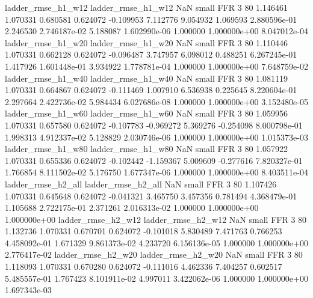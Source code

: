       ladder_rmse_h1_w12       ladder_rmse_h1_w12                   NaN      small      FFR                 3 80 1.146461       1.070331 0.680581       0.624072   -0.109953      7.112776      9.054932     1.069593   2.880596e-01  2.246530 2.746187e-02     5.188087   1.602990e-06            1.000000    1.000000e+00        8.047012e-04
      ladder_rmse_h1_w20       ladder_rmse_h1_w20                   NaN      small      FFR                 3 80 1.110446       1.070331 0.662128       0.624072   -0.096487      3.747957      6.098012     0.488251   6.267245e-01  1.417926 1.601448e-01     3.934922   1.778781e-04            1.000000    1.000000e+00        7.648759e-02
      ladder_rmse_h1_w40       ladder_rmse_h1_w40                   NaN      small      FFR                 3 80 1.081119       1.070331 0.664867       0.624072   -0.111469      1.007910      6.536938     0.225645   8.220604e-01  2.297664 2.422736e-02     5.984434   6.027686e-08            1.000000    1.000000e+00        3.152480e-05
      ladder_rmse_h1_w60       ladder_rmse_h1_w60                   NaN      small      FFR                 3 80 1.059956       1.070331 0.657580       0.624072   -0.107783     -0.969272      5.369276    -0.254098   8.000798e-01  1.998313 4.912337e-02     5.128829   2.030746e-06            1.000000    1.000000e+00        1.015373e-03
      ladder_rmse_h1_w80       ladder_rmse_h1_w80                   NaN      small      FFR                 3 80 1.057922       1.070331 0.655336       0.624072   -0.102442     -1.159367      5.009609    -0.277616   7.820327e-01  1.766854 8.111502e-02     5.176750   1.677347e-06            1.000000    1.000000e+00        8.403511e-04
      ladder_rmse_h2_all       ladder_rmse_h2_all                   NaN      small      FFR                 3 80 1.107426       1.070331 0.645648       0.624072   -0.041321      3.465750      3.457356     0.781494   4.368479e-01  1.105688 2.722175e-01     2.371261   2.016313e-02            1.000000    1.000000e+00        1.000000e+00
      ladder_rmse_h2_w12       ladder_rmse_h2_w12                   NaN      small      FFR                 3 80 1.132736       1.070331 0.670701       0.624072   -0.101018      5.830489      7.471763     0.766253   4.458092e-01  1.671329 9.861373e-02     4.233720   6.156136e-05            1.000000    1.000000e+00        2.776417e-02
      ladder_rmse_h2_w20       ladder_rmse_h2_w20                   NaN      small      FFR                 3 80 1.118093       1.070331 0.670280       0.624072   -0.111016      4.462336      7.404257     0.602517   5.485557e-01  1.767423 8.101911e-02     4.997011   3.422062e-06            1.000000    1.000000e+00        1.697343e-03
